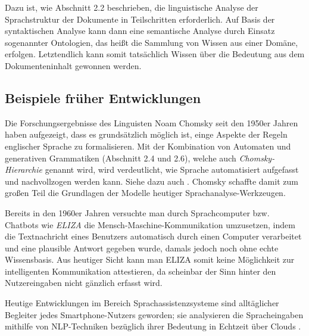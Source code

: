 \documentclass[12pt]{report}
\begin{document}
Dazu ist, wie Abschnitt 2.2 beschrieben, die linguistische Analyse der Sprachstruktur der Dokumente in Teilschritten erforderlich. Auf Basis der syntaktischen Analyse kann dann eine semantische Analyse durch Einsatz sogenannter Ontologien, das heißt die Sammlung von Wissen aus einer Domäne, erfolgen. Letztendlich kann somit tatsächlich Wissen über die Bedeutung aus dem Dokumenteninhalt gewonnen werden.

\subsection{Beispiele früher Entwicklungen}
Die Forschungsergebnisse des Linguisten Noam Chomsky seit den 1950er Jahren haben aufgezeigt, dass es grundsätzlich möglich ist, einge Aspekte der Regeln englischer Sprache zu formalisieren. Mit der Kombination von Automaten und generativen Grammatiken (Abschnitt 2.4 und 2.6), welche auch \textit{Chomsky-Hierarchie} genannt wird, wird verdeutlicht, wie Sprache automatisiert aufgefasst und nachvollzogen werden kann. Siehe dazu auch \cite{cho57}. Chomsky schaffte damit zum großen Teil die Grundlagen der Modelle heutiger Sprachanalyse-Werkzeugen.

Bereits in den 1960er Jahren versuchte man durch Sprachcomputer bzw. Chatbots wie \textit{ELIZA} \cite{wei66} die Mensch-Maschine-Kommunikation umzusetzen, indem die Textnachricht eines Benutzers automatisch durch einen Computer verarbeitet und eine plausible Antwort gegeben wurde, damals jedoch noch ohne echte Wissensbasis. Aus heutiger Sicht kann man ELIZA somit keine Möglichkeit zur \glqq   intelligenten\grqq{} Kommunikation attestieren, da scheinbar der Sinn hinter den Nutzereingaben nicht gänzlich erfasst wird.

Heutige Entwicklungen im Bereich Sprachassistenzsysteme sind alltäglicher Begleiter jedes Smartphone-Nutzers geworden; sie analysieren die Spracheingaben mithilfe von NLP-Techniken bezüglich ihrer Bedeutung in Echtzeit über Clouds \cite{hao14}.
\end{document}
